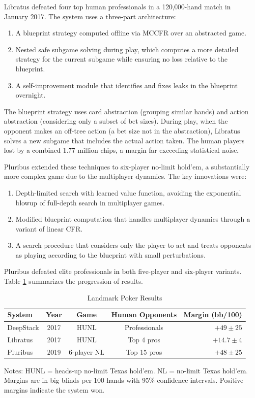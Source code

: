 Libratus \citep{brown2017superhuman} defeated four top human professionals in a 120,000-hand match in January 2017. The system uses a three-part architecture:
\begin{enumerate}
    \item A blueprint strategy computed offline via MCCFR over an abstracted game.
    \item Nested safe subgame solving during play, which computes a more detailed strategy for the current subgame while ensuring no loss relative to the blueprint.
    \item A self-improvement module that identifies and fixes leaks in the blueprint overnight.
\end{enumerate}

The blueprint strategy uses card abstraction (grouping similar hands) and action abstraction (considering only a subset of bet sizes). During play, when the opponent makes an off-tree action (a bet size not in the abstraction), Libratus solves a new subgame that includes the actual action taken. The human players lost by a combined 1.77 million chips, a margin far exceeding statistical noise.

Pluribus \citep{brown2019superhuman} extended these techniques to six-player no-limit hold'em, a substantially more complex game due to the multiplayer dynamics. The key innovations were:
\begin{enumerate}
    \item Depth-limited search with learned value function, avoiding the exponential blowup of full-depth search in multiplayer games.
    \item Modified blueprint computation that handles multiplayer dynamics through a variant of linear CFR.
    \item A search procedure that considers only the player to act and treats opponents as playing according to the blueprint with small perturbations.
\end{enumerate}

Pluribus defeated elite professionals in both five-player and six-player variants. Table \ref{tab:poker} summarizes the progression of results.

\begin{table}[htbp]
\centering
\caption{Landmark Poker Results}
\label{tab:poker}
\begin{tabular}{lcccr}
\toprule
System & Year & Game & Human Opponents & Margin (bb/100) \\
\midrule
DeepStack & 2017 & HUNL & Professionals & $+49 \pm 25$ \\
Libratus & 2017 & HUNL & Top 4 pros & $+14.7 \pm 4$ \\
Pluribus & 2019 & 6-player NL & Top 15 pros & $+48 \pm 25$ \\
\bottomrule
\end{tabular}
\begin{minipage}{0.9\textwidth}
\footnotesize
Notes: HUNL = heads-up no-limit Texas hold'em. NL = no-limit Texas hold'em. Margins are in big blinds per 100 hands with 95\% confidence intervals. Positive margins indicate the system won.
\end{minipage}
\end{table}

